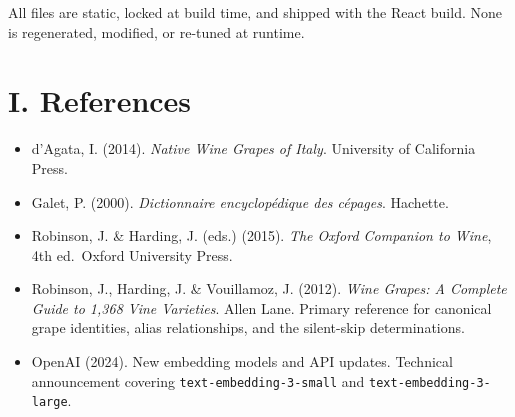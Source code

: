 \documentclass[11pt]{article}
\begin{document}
All files are static, locked at build time, and shipped with the React build. None is regenerated, modified, or re-tuned at runtime.

\section*{I. References}

\begin{itemize}[leftmargin=2em,itemsep=0.2em]
\item d'Agata, I. (2014). \emph{Native Wine Grapes of Italy}. University of California Press.
\item Galet, P. (2000). \emph{Dictionnaire encyclop\'edique des c\'epages}. Hachette.
\item Robinson, J. \& Harding, J. (eds.) (2015). \emph{The Oxford Companion to Wine}, 4th ed.\ Oxford University Press.
\item Robinson, J., Harding, J. \& Vouillamoz, J. (2012). \emph{Wine Grapes: A Complete Guide to 1,368 Vine Varieties}. Allen Lane. Primary reference for canonical grape identities, alias relationships, and the silent-skip determinations.
\item OpenAI (2024). New embedding models and API updates. Technical announcement covering \texttt{text-embedding-3-small} and \texttt{text-embedding-3-large}.
\end{itemize}
\end{document}
